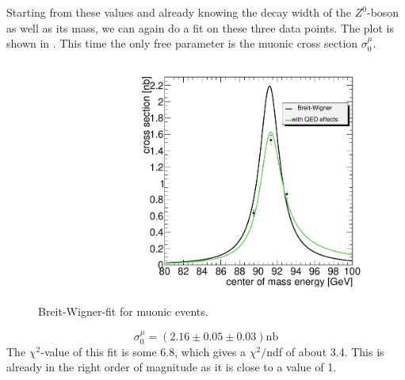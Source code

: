 \documentclass[epj,nopacs]{svjour}
\begin{document}
Starting from these values and already knowing the decay width of the
$Z^0$-boson as well as its mass, we can again do a fit on these three data
points. The plot is shown in . This time the only free
parameter is the muonic cross section $σ_0^μ$.
\begin{figure}[htb]
 \centering
 \includegraphics[width=1\columnwidth,keepaspectratio]{finalmu_fit}
 \caption{Breit-Wigner-fit for muonic events.}
 \label{fig:fit_muons}
\end{figure}
\begin{equation}
\nonumber σ_0^μ = (2.16 \pm 0.05 \pm 0.03) \si{\nano\barn}
\end{equation}
The $χ^2$-value of this fit is some 6.8, which gives a $χ^2/$ndf of about 3.4.
This is already in the right order of magnitude as it is close to a value of 1.
\end{document}
